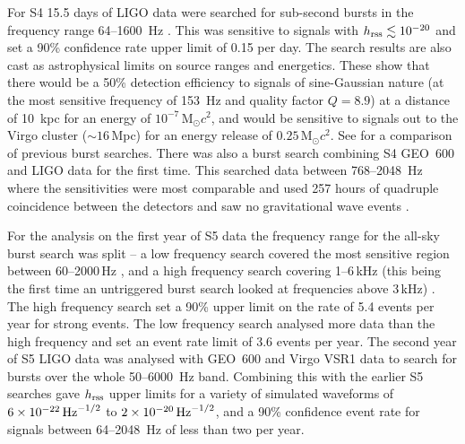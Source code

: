 \documentclass{article}
\begin{document}
For S4 15.5 days of LIGO data were searched for sub-second bursts
in the frequency range 64--1600~Hz \cite{Abbott:2007b}. This was sensitive to
signals with $h_{\rm rss}\lesssim10^{-20}$ and set a 90\% confidence rate
upper limit of 0.15 per day. The search results are also cast as astrophysical
limits on source ranges and energetics. These show that there would be a 50\%
detection efficiency to signals of sine-Gaussian nature (at the most sensitive 
frequency of 153~Hz and quality factor $Q=8.9$) at a distance of 10~kpc for an
energy of $10^{-7}$\,M$_{\odot}c^2$, and would be sensitive to signals out to
the Virgo cluster ($\sim16$\,Mpc) for an energy release of
$0.25$\,M$_{\odot}c^2$. See \cite{Abbott:2007b} for a comparison of previous
burst searches. There was also a burst search combining S4 GEO~600 and LIGO data
for the first time. This searched data between 768--2048~Hz where the
sensitivities were most comparable and used 257 hours of quadruple coincidence
between the detectors and saw no gravitational wave events \cite{Abbott:2008b}.

For the analysis on the first year of S5 data the frequency range for the
all-sky burst search was split -- a low frequency search covered the most
sensitive region between 60--2000\,Hz \cite{Abbott:2009h}, and a high frequency
search covering 1--6\,kHz (this being the first time an
untriggered burst search looked at frequencies above 3\,kHz)
\cite{Abbott:2009i}. The high frequency search
set a 90\% upper limit on the rate of 5.4 events per year for strong events. The
low frequency search analysed more data than the high frequency and set an
event rate limit of 3.6 events per year. The second year of S5 LIGO data was
analysed with GEO~600 and Virgo VSR1 data \cite{Abadie:2010d} to search for 
bursts over the whole 50--6000~Hz band. Combining this with the earlier S5 
searches gave $h_{\rm rss}$ upper limits for a variety of simulated waveforms 
of $6\times10^{-22}\,{\rm Hz}^{-1/2}$ to $2\times10^{-20}\,{\rm Hz}^{-1/2}$, and a
90\% confidence event rate for signals between 64--2048~Hz of less than two 
per year.
\end{document}

